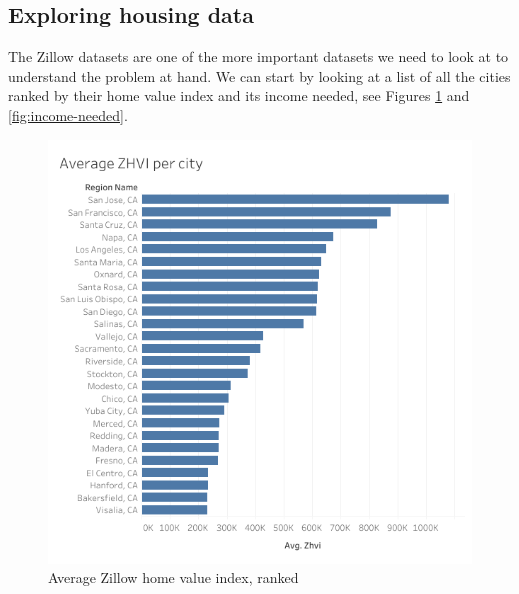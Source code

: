 \documentclass[journal]{IEEEtran}
\begin{document}
\subsection{Exploring housing data}

The Zillow datasets are one of the more important datasets we need to look at
to understand the problem at hand. We can start by looking at a list of all the
cities ranked by their home value index and its income needed, see Figures
\ref{fig:zhvi} and \ref{fig:income-needed}.

\begin{figure}
	\centering
	\includegraphics[width=\linewidth]{zhvi.png}
	\caption{Average Zillow home value index, ranked}
	\label{fig:zhvi}
\end{figure}
\end{document}
